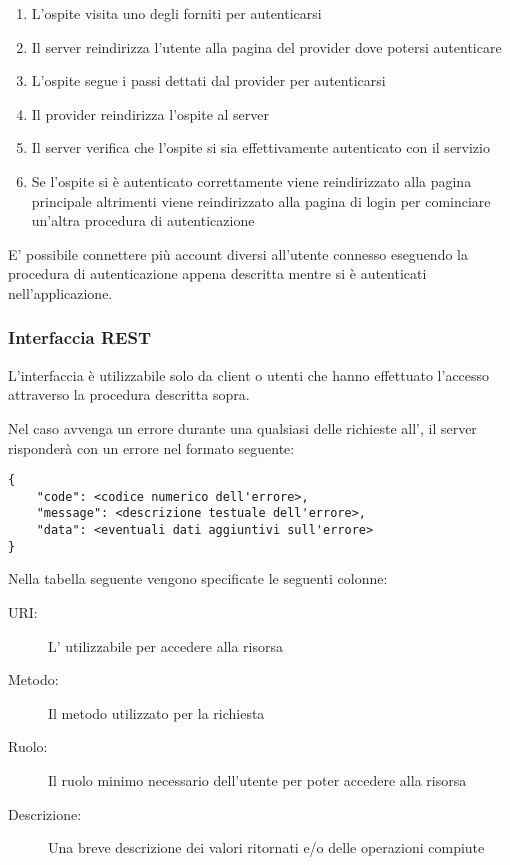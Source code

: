 \documentclass[12pt,a4paper]{article}
\begin{document}
\begin{enumerate}
    \item L'ospite visita uno degli  forniti per autenticarsi
    \item Il server reindirizza l'utente alla pagina del provider dove potersi autenticare
    \item L'ospite segue i passi dettati dal provider per autenticarsi
    \item Il provider reindirizza l'ospite al server
    \item Il server verifica che l'ospite si sia effettivamente autenticato con il servizio
    \item Se l'ospite si è autenticato correttamente viene reindirizzato alla pagina principale
        altrimenti viene reindirizzato alla pagina di login per cominciare un'altra procedura di
        autenticazione
\end{enumerate}

E' possibile connettere più account diversi all'utente connesso eseguendo la procedura
di autenticazione appena descritta mentre si è autenticati nell'applicazione.

\subsubsection{Interfaccia REST}

L'interfaccia  è utilizzabile solo da client o utenti che hanno effettuato l'accesso
attraverso la procedura descritta sopra.

Nel caso avvenga un errore durante una qualsiasi delle richieste all', il server risponderà
con un errore nel formato  seguente:

\begin{lstlisting}
{
    "code": <codice numerico dell'errore>,
    "message": <descrizione testuale dell'errore>,
    "data": <eventuali dati aggiuntivi sull'errore>
}
\end{lstlisting}

Nella tabella seguente vengono specificate le seguenti colonne:

\begin{description}
    \item[URI:] L' utilizzabile per accedere alla risorsa
    \item[Metodo:] Il metodo  utilizzato per la richiesta
    \item[Ruolo:] Il ruolo minimo necessario dell'utente per poter accedere
        alla risorsa
    \item[Descrizione:] Una breve descrizione dei valori ritornati e/o delle
        operazioni compiute
\end{description}
\end{document}
